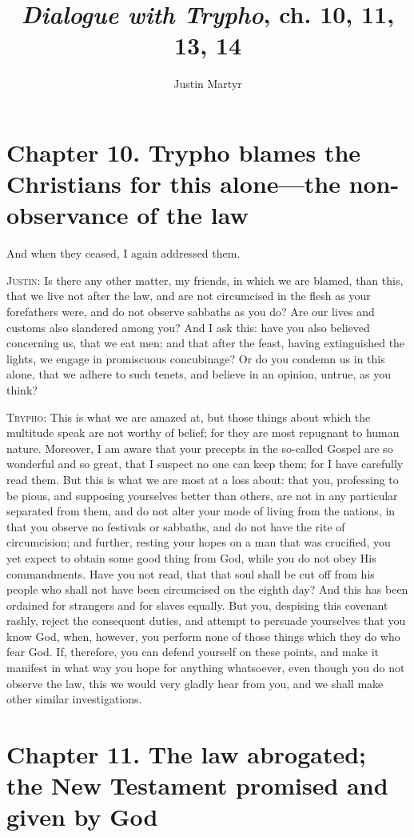 \documentclass[9pt, twocolumn, oneside, a4paper]{memoir}
\title{\textit{Dialogue with Trypho}, ch. 10, 11, 13, 14}
\author{ Justin Martyr}
\date{}
\begin{document}
\maketitle
\section*{Chapter 10. Trypho blames the Christians for this alone—the non-observance of the law}


And when they ceased, I again addressed them.

\textsc{Justin:} Is there any other matter, my friends, in which we are blamed, than this, that we live not after the law, and are not circumcised in the flesh as your forefathers were, and do not observe sabbaths as you do? Are our lives and customs also slandered among you? And I ask this: have you also believed concerning us, that we eat men; and that after the feast, having extinguished the lights, we engage in promiscuous concubinage? Or do you condemn us in this alone, that we adhere to such tenets, and believe in an opinion, untrue, as you think?

\textsc{Trypho:} This is what we are amazed at, but those things about which the multitude speak are not worthy of belief; for they are most repugnant to human nature. Moreover, I am aware that your precepts in the so-called Gospel are so wonderful and so great, that I suspect no one can keep them; for I have carefully read them. But this is what we are most at a loss about: that you, professing to be pious, and supposing yourselves better than others, are not in any particular separated from them, and do not alter your mode of living from the nations, in that you observe no festivals or sabbaths, and do not have the rite of circumcision; and further, resting your hopes on a man that was crucified, you yet expect to obtain some good thing from God, while you do not obey His commandments. Have you not read, that that soul shall be cut off from his people who shall not have been circumcised on the eighth day? And this has been ordained for strangers and for slaves equally. But you, despising this covenant rashly, reject the consequent duties, and attempt to persuade yourselves that you know God, when, however, you perform none of those things which they do who fear God. If, therefore, you can defend yourself on these points, and make it manifest in what way you hope for anything whatsoever, even though you do not observe the law, this we would very gladly hear from you, and we shall make other similar investigations.
\section*{Chapter 11. The law abrogated; the New Testament promised and given by God}
\end{document}
